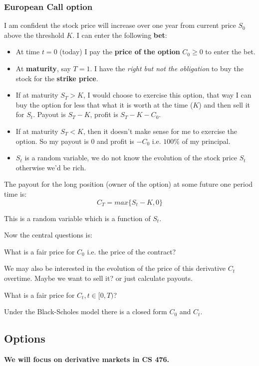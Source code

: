 \documentclass{article}
\begin{document}
\subsubsection{European Call option}
I am confident the stock price will increase over one year from current price $S_0$ above the threshold $K$. I can enter the following \textbf{bet}: 
\begin{itemize}
\item At time $t=0$ (today) I pay the \textbf{price of the option} $C_0 \geq 0$ to enter the bet. 
\item At \textbf{maturity}, say $T=1$. I have the \textit{right but not the obligation} to buy the stock for the \textbf{strike price}. 
\item If at maturity $S_T > K$, I would choose to exercise this option, that way I can buy the option for less that what it is worth at the time ($K$) and then sell it for $S_t$. Payout is $S_T-K$, profit is $S_T- K - C_0$.
\item If at maturity $S_T < K$, then it doesn't make sense for me to exercise the option. So my payout is $0$ and profit is $-C_0$ i.e. $100\%$ of my principal.
\item $S_t$ is a random variable, we do not know the evolution of the stock price $S_t$ otherwise we'd be rich. 
\end{itemize}

The payout for the long position (owner of the option) at some future one period time is: 
\[ C_T = max\{S_t - K, 0\} \]

This is a random variable which is a function of $S_t$. 

Now the central questions is: 

\begin{center}
What is a fair price for $C_0$ i.e. the price of the contract?
\end{center}

We may also be interested in the evolution of the price of this derivative $C_t$ overtime. Maybe we want to sell it? or just calculate payouts. 

\begin{center}
What is a fair price for $C_t , t \in [0, T)$?
\end{center}

Under the Black-Scholes model there is a closed form $C_0$ and $C_t$. 

\subsection{Options}
\textbf{We will focus on derivative markets in CS 476.}
\end{document}
